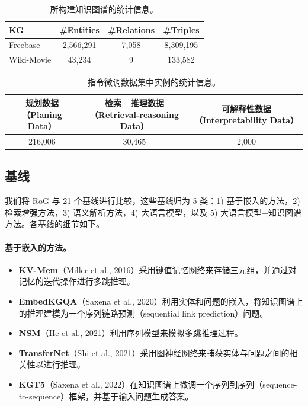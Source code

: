 \documentclass[11pt,UTF8,fontset=fandol]{ctexart}
\begin{document}
\begin{table}[H]
\centering
\caption{所构建知识图谱的统计信息。}
\label{tab:10}
\begin{tabular}{lccc}
\toprule
KG & \#Entities & \#Relations & \#Triples \\
\midrule
Freebase    & 2,566,291 & 7,058 & 8,309,195 \\
Wiki-Movie  & 43,234    & 9     & 133,582 \\
\bottomrule
\end{tabular}
\end{table}

\begin{table}[H]
\centering
\caption{指令微调数据集中实例的统计信息。}
\label{tab:11}
\begin{tabular}{ccc}
\toprule
规划数据（Planing Data） & 检索—推理数据（Retrieval-reasoning Data） & 可解释性数据（Interpretability Data） \\
\midrule
216,006 & 30,465 & 2,000 \\
\bottomrule
\end{tabular}
\end{table}

\subsection{基线}
\label{app:a5}

我们将 RoG 与 21 个基线进行比较，这些基线归为 5 类：1) 基于嵌入的方法，2) 检索增强方法，3) 语义解析方法，4) 大语言模型，以及 5) 大语言模型+知识图谱方法。各基线的细节如下。

\paragraph{基于嵌入的方法。}
\begin{itemize}[leftmargin=2em]
\item \textbf{KV-Mem}（Miller et al., 2016）采用键值记忆网络来存储三元组，并通过对记忆的迭代操作进行多跳推理。
\item \textbf{EmbedKGQA}（Saxena et al., 2020）利用实体和问题的嵌入，将知识图谱上的推理建模为一个序列链路预测（sequential link prediction）问题。
\item \textbf{NSM}（He et al., 2021）利用序列模型来模拟多跳推理过程。
\item \textbf{TransferNet}（Shi et al., 2021）采用图神经网络来捕获实体与问题之间的相关性以进行推理。
\item \textbf{KGT5}（Saxena et al., 2022）在知识图谱上微调一个序列到序列（sequence-to-sequence）框架，并基于输入问题生成答案。
\end{itemize}
\end{document}
